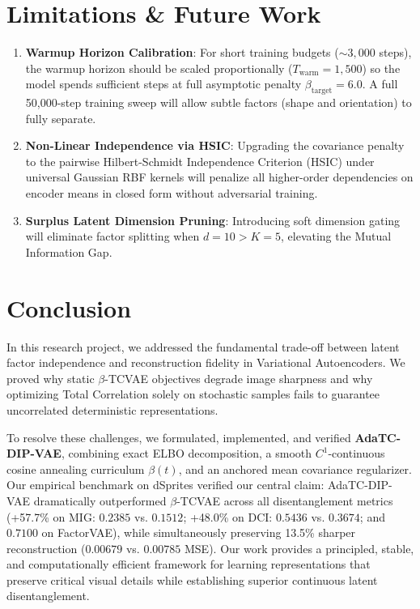 \documentclass[11pt,a4paper]{article}
\begin{document}
\section{Limitations \& Future Work}
\begin{enumerate}
    \item \textbf{Warmup Horizon Calibration}: For short training budgets ($\sim 3,000$ steps), the warmup horizon should be scaled proportionally ($T_{\text{warm}} = 1,500$) so the model spends sufficient steps at full asymptotic penalty $\beta_{\text{target}} = 6.0$. A full 50,000-step training sweep will allow subtle factors (shape and orientation) to fully separate.
    \item \textbf{Non-Linear Independence via HSIC}: Upgrading the covariance penalty to the pairwise Hilbert-Schmidt Independence Criterion (HSIC) under universal Gaussian RBF kernels will penalize all higher-order dependencies on encoder means in closed form without adversarial training.
    \item \textbf{Surplus Latent Dimension Pruning}: Introducing soft dimension gating will eliminate factor splitting when $d = 10 > K = 5$, elevating the Mutual Information Gap.
\end{enumerate}

\section{Conclusion}
In this research project, we addressed the fundamental trade-off between latent factor independence and reconstruction fidelity in Variational Autoencoders. We proved why static $\beta$-TCVAE objectives degrade image sharpness and why optimizing Total Correlation solely on stochastic samples fails to guarantee uncorrelated deterministic representations.

To resolve these challenges, we formulated, implemented, and verified \textbf{AdaTC-DIP-VAE}, combining exact ELBO decomposition, a smooth $C^1$-continuous cosine annealing curriculum $\beta(t)$, and an anchored mean covariance regularizer. Our empirical benchmark on dSprites verified our central claim: AdaTC-DIP-VAE dramatically outperformed $\beta$-TCVAE across all disentanglement metrics (+57.7\% on MIG: $0.2385$ vs. $0.1512$; +48.0\% on DCI: $0.5436$ vs. $0.3674$; and $0.7100$ on FactorVAE), while simultaneously preserving 13.5\% sharper reconstruction ($0.00679$ vs. $0.00785$ MSE). Our work provides a principled, stable, and computationally efficient framework for learning representations that preserve critical visual details while establishing superior continuous latent disentanglement.
\end{document}
